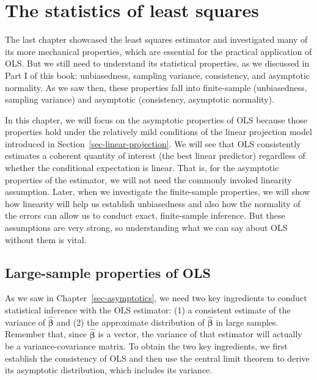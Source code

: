 \documentclass[
  letterpaper,
  DIV=11,
  numbers=noendperiod]{scrreprt}
\newcommand{\mb}{\symbf}
\newcommand{\bhat}{\widehat{\mb{\beta}}}
\theoremstyle{plain}
\theoremstyle{definition}
\theoremstyle{definition}
\theoremstyle{remark}
\begin{document}
\hypertarget{sec-ols-statistics}{%
\chapter{The statistics of least squares}\label{sec-ols-statistics}}

The last chapter showcased the least squares estimator and investigated
many of its more mechanical properties, which are essential for the
practical application of OLS. But we still need to understand its
statistical properties, as we discussed in Part I of this book:
unbiasedness, sampling variance, consistency, and asymptotic normality.
As we saw then, these properties fall into finite-sample (unbiasedness,
sampling variance) and asymptotic (consistency, asymptotic normality).

In this chapter, we will focus on the asymptotic properties of OLS
because those properties hold under the relatively mild conditions of
the linear projection model introduced in
Section~\ref{sec-linear-projection}. We will see that OLS consistently
estimates a coherent quantity of interest (the best linear predictor)
regardless of whether the conditional expectation is linear. That is,
for the asymptotic properties of the estimator, we will not need the
commonly invoked linearity assumption. Later, when we investigate the
finite-sample properties, we will show how linearity will help us
establish unbiasedness and also how the normality of the errors can
allow us to conduct exact, finite-sample inference. But these
assumptions are very strong, so understanding what we can say about OLS
without them is vital.

\hypertarget{large-sample-properties-of-ols}{%
\section{Large-sample properties of
OLS}\label{large-sample-properties-of-ols}}

As we saw in Chapter~\ref{sec-asymptotics}, we need two key ingredients
to conduct statistical inference with the OLS estimator: (1) a
consistent estimate of the variance of \(\bhat\) and (2) the approximate
distribution of \(\bhat\) in large samples. Remember that, since
\(\bhat\) is a vector, the variance of that estimator will actually be a
variance-covariance matrix. To obtain the two key ingredients, we first
establish the consistency of OLS and then use the central limit theorem
to derive its asymptotic distribution, which includes its variance.
\end{document}
